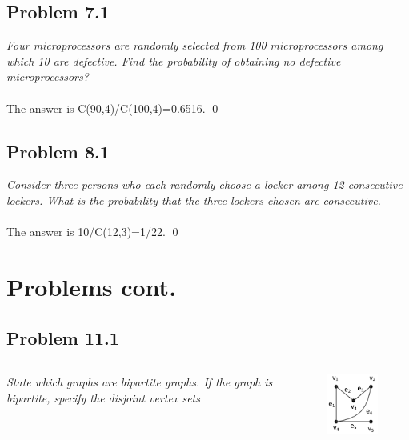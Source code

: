 \documentclass[
        handout,
        ]{beamer}
\begin{document}
    \subsection{Problem 7.1}
        \begin{frame}[c]{\subsecname}
            \emph{Four microprocessors are randomly selected from 100 microprocessors among which 10 are defective. Find the probability of obtaining no defective microprocessors?} \\$\;$\\ \pause
            The answer is C(90,4)/C(100,4)=0.6516. \qed
        \end{frame}



    \subsection{Problem 8.1}
        \begin{frame}[c]{\subsecname}
            \emph{Consider three persons who each randomly choose a locker among 12 consecutive
lockers. What is the probability that the three lockers chosen are consecutive.}\\$\;$\\\pause
            The answer is 10/C(12,3)=1/22. \qed
        \end{frame}


\section{Problems cont.}
    \subsection{Problem 11.1}
        \begin{frame}[c]{\subsecname}
            \begin{columns}
                \emph{State which graphs are bipartite graphs. If the graph is bipartite, specify the disjoint vertex sets}\\$\;$\\
            \column{28.6mm}
                \begin{figure}
                    \centering
                    \includegraphics[width=28.6mm]{tut11p10}
                \end{figure}
            \end{columns}
        \end{frame}
        
\end{document}
